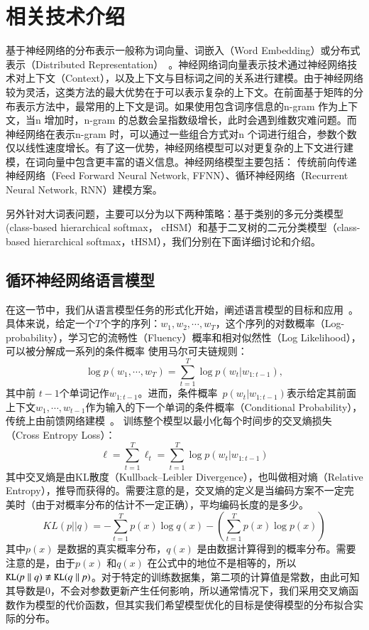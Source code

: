 \chapter{相关技术介绍}
基于神经网络的分布表示一般称为词向量、词嵌入（Word Embedding）或分布式表示（Distributed Representation）~。神经网络词向量表示技术通过神经网络技术对上下文（Context），以及上下文与目标词之间的关系进行建模。由于神经网络较为灵活，这类方法的最大优势在于可以表示复杂的上下文。在前面基于矩阵的分布表示方法中，最常用的上下文是词。如果使用包含词序信息的n-gram 作为上下文，当n 增加时，n-gram 的总数会呈指数级增长，此时会遇到维数灾难问题。而神经网络在表示n-gram 时，可以通过一些组合方式对n 个词进行组合，参数个数仅以线性速度增长。有了这一优势，神经网络模型可以对更复杂的上下文进行建模，在词向量中包含更丰富的语义信息。神经网络模型主要包括： 传统前向传递神经网络（Feed Forward Neural Network, FFNN）、循环神经网络（Recurrent Neural Network, RNN）建模方案。

另外针对大词表问题，主要可以分为以下两种策略：基于类别的多元分类模型(class-based hierarchical softmax， cHSM）和基于二叉树的二元分类模型（class-based hierarchical softmax，tHSM），我们分别在下面详细讨论和介绍。

\section{循环神经网络语言模型}
在这一节中，我们从语言模型任务的形式化开始，阐述语言模型的目标和应用~。 具体来说，给定一个$T$个字的序列：$w_1,w_2,\cdots,w_T$，这个序列的对数概率（Log-probability），学习它的流畅性（Fluency）概率和相对似然性（Log Likelihood），可以被分解成一系列的条件概率 使用马尔可夫链规则：
\begin{equation}
\label{laguage_model}
 \log p(w_1,\cdots, w_T ) = \sum_{t=1}^T \log p(w_t | w_{1:t-1}),
\end{equation}
其中前 $t-1$个单词记作$w_ {1:t-1}$。进而，条件概率~$p(w_t | w_ {1:t-1})$表示给定其前面上下文$ w_1,\cdots,w_ {t-1} $作为输入的下一个单词的条件概率（Conditional Probability）， 传统上由前馈网络建模~。 训练整个模型以最小化每个时间步的交叉熵损失（Cross Entropy Loss）：
\begin{equation}\label{equ:losses}
  \ell=\sum_{t=1}^{T}\ell_t=\sum_{t=1}^{T}\log p(w_t | w_{1:t-1})
\end{equation}
其中交叉熵是由KL散度（Kullback–Leibler Divergence），也叫做相对熵（Relative Entropy），推导而获得的。需要注意的是，交叉熵的定义是当编码方案不一定完美时（由于对概率分布的估计不一定正确），平均编码长度的是多少。
\begin{equation}\label{equ:losses}
  KL(p||q)=-\sum_{t=1}^{T}p(x)\log q(x) - (\sum_{t=1}^{T}p(x)\log p(x))
\end{equation}
其中$p(x)$ 是数据的真实概率分布，$q(x)$ 是由数据计算得到的概率分布。需要注意的是，由于$p(x)$ 和$q(x)$ 在公式中的地位不是相等的，所以$\tt KL \it(p\parallel q)\not\equiv \tt KL \it (q\parallel p)$。对于特定的训练数据集，第二项的计算值是常数，由此可知其导数是0，不会对参数更新产生任何影响，所以通常情况下，我们采用交叉熵函数作为模型的代价函数，但其实我们希望模型优化的目标是使得模型的分布拟合实际的分布。

